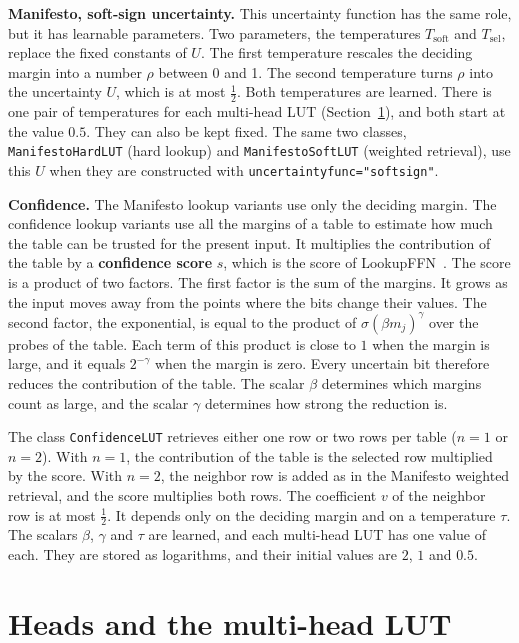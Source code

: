 \documentclass[11pt]{article}
\DeclareRobustCommand{\code}[1]{{\renewcommand{\_}{\textunderscore\allowbreak}\texttt{#1}}}
\newcommand{\term}[1]{\textbf{#1}}
\begin{document}
\textbf{Manifesto, soft-sign uncertainty.} This uncertainty function has the same role, but it has
learnable parameters. Two parameters, the temperatures $T_\text{soft}$ and $T_\text{sel}$,
replace the fixed constants of $U$. The first temperature rescales the deciding margin into a number
$\rho$ between 0 and 1. The second temperature turns $\rho$ into the uncertainty $U$, which is at most
$\tfrac12$. Both temperatures are learned. There is one pair of temperatures for each multi-head LUT
(Section~\ref{sec:heads}), and both start at the value $0.5$. They can also be kept fixed. The same two
classes, \code{ManifestoHardLUT} (hard lookup) and \code{ManifestoSoftLUT} (weighted retrieval), use
this $U$ when they are constructed with \code{uncertainty\_func="softsign"}.

\textbf{Confidence.} The Manifesto lookup variants use only the deciding margin. The confidence lookup
variants use all the margins of a table to estimate how much the table can be trusted for the present input. It
multiplies the contribution of the table by a \term{confidence score} $s$, which is the score of
LookupFFN~\citep{lookupffn}. The score is a product of two factors. The first factor is the sum of the
margins. It grows as the input moves away from the points where the bits change their values. The second
factor, the exponential, is equal to the product of $\sigma(\beta m_j)^\gamma$ over the probes of the
table. Each term of this product is close to $1$ when the margin is large, and it equals $2^{-\gamma}$
when the margin is zero. Every uncertain bit therefore reduces the contribution of the table. The scalar
$\beta$ determines which margins count as large, and the scalar $\gamma$ determines how strong the
reduction is.

The class \code{ConfidenceLUT} retrieves either one row or two rows per table ($n=1$ or $n=2$). With
$n=1$, the contribution of the table is the selected row multiplied by the score. With $n=2$, the
neighbor row is added as in the Manifesto weighted retrieval, and the score multiplies both rows. The coefficient $v$ of the
neighbor row is at most $\tfrac12$. It depends only on the deciding margin and on a temperature $\tau$.
The scalars $\beta$, $\gamma$ and $\tau$ are learned, and each multi-head LUT has one value of each. They
are stored as logarithms, and their initial values are $2$, $1$ and $0.5$.

\section{Heads and the multi-head LUT}
\label{sec:heads}
\end{document}
